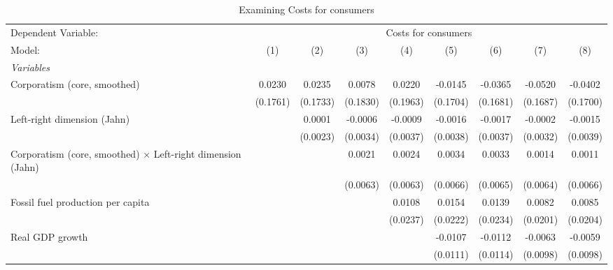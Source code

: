 
\begin{table}[htbp]
   \caption{Examining Costs for consumers}
   \centering
   \begin{tabular}{lcccccccc}
      \tabularnewline \midrule \midrule
      Dependent Variable: & \multicolumn{8}{c}{Costs for consumers}\\
      Model:                                                             & (1)      & (2)      & (3)      & (4)      & (5)      & (6)      & (7)      & (8)\\  
      \midrule
      \emph{Variables}\\
      Corporatism (core, smoothed)                                       & 0.0230   & 0.0235   & 0.0078   & 0.0220   & -0.0145  & -0.0365  & -0.0520  & -0.0402\\   
                                                                         & (0.1761) & (0.1733) & (0.1830) & (0.1963) & (0.1704) & (0.1681) & (0.1687) & (0.1700)\\   
      Left-right dimension (Jahn)                                        &          & 0.0001   & -0.0006  & -0.0009  & -0.0016  & -0.0017  & -0.0002  & -0.0015\\   
                                                                         &          & (0.0023) & (0.0034) & (0.0037) & (0.0038) & (0.0037) & (0.0032) & (0.0039)\\   
      Corporatism (core, smoothed) $\times$ Left-right dimension (Jahn)  &          &          & 0.0021   & 0.0024   & 0.0034   & 0.0033   & 0.0014   & 0.0011\\   
                                                                         &          &          & (0.0063) & (0.0063) & (0.0066) & (0.0065) & (0.0064) & (0.0066)\\   
      Fossil fuel production per capita                                  &          &          &          & 0.0108   & 0.0154   & 0.0139   & 0.0082   & 0.0085\\   
                                                                         &          &          &          & (0.0237) & (0.0222) & (0.0234) & (0.0201) & (0.0204)\\   
      Real GDP growth                                                    &          &          &          &          & -0.0107  & -0.0112  & -0.0063  & -0.0059\\   
                                                                         &          &          &          &          & (0.0111) & (0.0114) & (0.0098) & (0.0098)\\   

\end{tabular}
\end{table}
